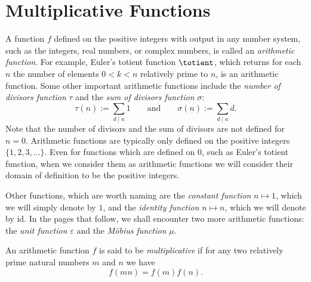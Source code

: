
\section{Multiplicative Functions}

A function $f$ defined on the positive integers with output in any number system, such as the integers, real numbers, or complex numbers, is called an \emph{arithmetic function}. For example, Euler's totient function $\totient$, which returns for each $n$ the number of elements $0<k<n$ relatively prime to $n$, is an arithmetic function. Some other important arithmetic functions include the \emph{number of divisors function} $\tau$ and the \emph{sum of divisors function} $\sigma$:
\begin{equation*}
  \tau(n) := \sum_{d\mid n}1\qquad\text{and}\qquad \sigma(n) := \sum_{d\mid n}d.
\end{equation*}
Note that the number of divisors and the sum of divisors are not defined for $n=0$. Arithmetic functions are typically only defined on the positive integers $\{1,2,3,\ldots\}$. Even for functions which are defined on $0$, such as Euler's totient function, when we consider them as arithmetic functions we will consider their domain of definition to be the positive integers.

Other functions, which are worth naming are the \emph{constant function} $n\mapsto 1$, which we will simply denote by $1$, and the \emph{identity function} $n\mapsto n$, which we will denote by $\mathrm{id}$. In the pages that follow, we shall encounter two more arithmetic functions: the \emph{unit function} $\varepsilon$ and the \emph{M\"obius function} $\mu$.

\begin{definition}
  An arithmetic function $f$ is said to be \emph{multiplicative} if for any two relatively prime natural numbers $m$ and $n$ we have
  \begin{equation*}
    f(mn)=f(m)f(n).
  \end{equation*}
\end{definition}

